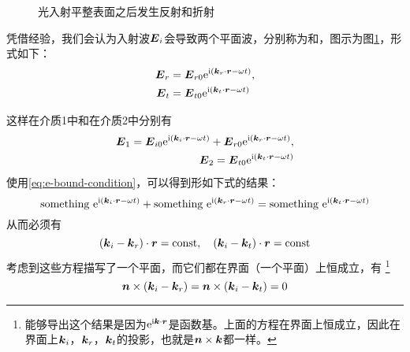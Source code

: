 \begin{figure}
    \centering
    \caption{光入射平整表面之后发生反射和折射}
    \label{fig:ray-refraction}
\end{figure}

凭借经验，我们会认为入射波$\vb*{E}_i$会导致两个平面波，分别称为和，图示为图\ref{fig:ray-refraction}，形式如下：
\[
    \begin{aligned}
        \vb*{E}_r &= \vb*{E}_{r0} \mathrm{e}^{\mathrm{i}(\vb*{k}_r \cdot \vb*{r} - \omega t)}, \\
        \vb*{E}_t &= \vb*{E}_{t0} \mathrm{e}^{\mathrm{i}(\vb*{k}_t \cdot \vb*{r} - \omega t)}
    \end{aligned}
\]

这样在介质1中和在介质2中分别有
\[
    \begin{aligned}
        \vb*{E}_1 = \vb*{E}_{i0} \mathrm{e}^{\mathrm{i}(\vb*{k}_i \cdot \vb*{r} - \omega t)} +  \vb*{E}_{r0} \mathrm{e}^{\mathrm{i}(\vb*{k}_r \cdot \vb*{r} - \omega t)}, \\
        \vb*{E}_2 = \vb*{E}_{t0} \mathrm{e}^{\mathrm{i}(\vb*{k}_t \cdot \vb*{r} - \omega t)}
    \end{aligned}
\]
使用\eqref{eq:e-bound-condition}，可以得到形如下式的结果：
\[
    \text{something } \mathrm{e}^{\mathrm{i}(\vb*{k}_i \cdot \vb*{r} - \omega t)} + \text{something } \mathrm{e}^{\mathrm{i}(\vb*{k}_r \cdot \vb*{r} - \omega t)} = \text{something } \mathrm{e}^{\mathrm{i}(\vb*{k}_t \cdot \vb*{r} - \omega t)}
\]
从而必须有
\[
    (\vb*{k}_i - \vb*{k}_r) \cdot \vb*{r} = \mathrm{const}, \quad (\vb*{k}_i - \vb*{k}_t) \cdot \vb*{r} = \mathrm{const}
\]
考虑到这些方程描写了一个平面，而它们都在界面（一个平面）上恒成立，有%
\footnote{能够导出这个结果是因为$\mathrm{e}^{\mathrm{i} \vb*{k} \cdot \vb*{r}}$是函数基。上面的方程在界面上恒成立，因此在界面上$\vb*{k}_i$，$\vb*{k}_r$，$\vb*{k}_t$的投影，也就是$\vb*{n} \times \vb*{k}$都一样。}
\begin{equation}
    \vb*{n} \times (\vb*{k}_i - \vb*{k}_r) = \vb*{n} \times (\vb*{k}_i - \vb*{k}_t) = 0
    \label{eq:k-and-n}
\end{equation}

